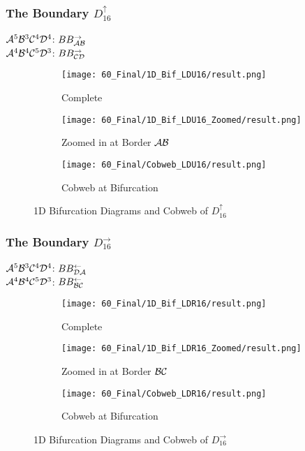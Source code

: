 \subsubsection{The Boundary $D_{16}^\uparrow$}

$\mathcal{A}^5\mathcal{B}^3\mathcal{C}^4\mathcal{D}^4$: $BB_{\mathcal{A}\mathcal{B}}^\rightarrow$ \\
$\mathcal{A}^4\mathcal{B}^4\mathcal{C}^5\mathcal{D}^3$: $BB_{\mathcal{C}\mathcal{D}}^\rightarrow$

\begin{figure}
    \centering
    \begin{subfigure}{0.3\textwidth}
        \centering
        \texttt{[image: 60\_Final/1D\_Bif\_LDU16/result.png]}
        \caption{Complete}
        \label{fig:final.bifurcation.D.up}
    \end{subfigure}
    \begin{subfigure}{0.3\textwidth}
        \centering
        \texttt{[image: 60\_Final/1D\_Bif\_LDU16\_Zoomed/result.png]}
        \caption{Zoomed in at Border $\mathcal{A}\mathcal{B}$}
        \label{fig:final.bifurcation.D.up.zoomed}
    \end{subfigure}
    \begin{subfigure}{0.3\textwidth}
        \centering
        \texttt{[image: 60\_Final/Cobweb\_LDU16/result.png]}
        \caption{Cobweb at Bifurcation}
        \label{fig:final.bifurcation.D.up.cobweb}
    \end{subfigure}
    \caption{1D Bifurcation Diagrams and Cobweb of $D_{16}^\uparrow$}
\end{figure}

\subsubsection{The Boundary $D_{16}^\rightarrow$}

$\mathcal{A}^5\mathcal{B}^3\mathcal{C}^4\mathcal{D}^4$: $BB_{\mathcal{D}\mathcal{A}}^\leftarrow$ \\
$\mathcal{A}^4\mathcal{B}^4\mathcal{C}^5\mathcal{D}^3$: $BB_{\mathcal{B}\mathcal{C}}^\leftarrow$

\begin{figure}
    \centering
    \begin{subfigure}{0.3\textwidth}
        \centering
        \texttt{[image: 60\_Final/1D\_Bif\_LDR16/result.png]}
        \caption{Complete}
        \label{fig:final.bifurcation.D.right}
    \end{subfigure}
    \begin{subfigure}{0.3\textwidth}
        \centering
        \texttt{[image: 60\_Final/1D\_Bif\_LDR16\_Zoomed/result.png]}
        \caption{Zoomed in at Border $\mathcal{B}\mathcal{C}$}
        \label{fig:final.bifurcation.D.right.zoomed}
    \end{subfigure}
    \begin{subfigure}{0.3\textwidth}
        \centering
        \texttt{[image: 60\_Final/Cobweb\_LDR16/result.png]}
        \caption{Cobweb at Bifurcation}
        \label{fig:final.bifurcation.D.right.cobweb}
    \end{subfigure}
    \caption{1D Bifurcation Diagrams and Cobweb of $D_{16}^\rightarrow$}
\end{figure}

